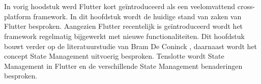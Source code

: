 \chapter{}
\label{ch:stand-van-zaken}

\newcommand\figureWidthModifier{0.6}



%
%

In vorig hoodstuk werd Flutter kort geïntroduceerd als een veelomvattend cross-platform framework. In dit hoofdstuk wordt de huidige stand van zaken van Flutter besproken. Aangezien Flutter recentelijk is geïntroduceerd wordt het framework regelmatig bijgewerkt met nieuwe functionaliteiten. Dit hoofdstuk bouwt verder op de literatuurstudie van Bram De Coninck \autocite{DeConinck2019}, daarnaast wordt het concept State Management uitvoerig besproken. Tenslotte wordt State Management in Flutter en de verschillende State Management benaderingen besproken. 
\newline

